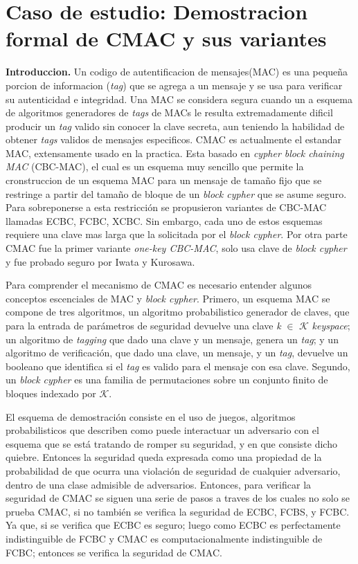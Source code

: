 \documentclass[runningheads]{llncs}
\begin{document}
\section{Caso de estudio: Demostracion formal de CMAC y sus variantes}
\textbf{Introduccion.} Un codigo de autentificacion de mensajes(MAC) es una pequeña porcion de informacion (\textit{tag}) que se agrega a un mensaje y se usa para verificar su autenticidad e integridad. Una MAC se considera segura cuando un a esquema de algoritmos generadores de \textit{tags} de MACs le resulta extremadamente dificil producir un \textit{tag} valido sin conocer la clave secreta, aun teniendo la habilidad de obtener \textit{tags} validos de mensajes especificos. CMAC es actualmente el estandar MAC, extensamente usado en la practica. Esta basado en \textit{cypher block chaining MAC} (CBC-MAC), el cual es un esquema muy sencillo que permite la cronstruccion de un esquema MAC para un mensaje de tamaño fijo que se restringe a partir del tamaño de bloque de un \textit{block cypher} que se asume seguro. Para sobreponerse a esta restricción se propusieron variantes de CBC-MAC llamadas ECBC, FCBC, XCBC. Sin embargo, cada uno de estos esquemas requiere una clave mas larga que la solicitada por el \textit{block cypher}. Por otra parte CMAC fue la primer variante \textit{one-key CBC-MAC}, solo usa clave de \textit{block cypher} y fue probado seguro por Iwata y Kurosawa.

Para comprender el mecanismo de CMAC es necesario entender algunos conceptos escenciales de MAC y \textit{block cypher}. Primero, un esquema MAC se compone de tres algoritmos, un algoritmo probabilistico generador de claves, que para la entrada de parámetros de seguridad devuelve una clave \textit{k} $\in$ $\mathcal{K}$ \textit{keyspace}; un algoritmo de \textit{tagging} que dado una clave y un mensaje, genera un \textit{tag}; y un algoritmo de verificación, que dado una clave, un mensaje, y un \textit{tag}, devuelve un booleano que identifica si el \textit{tag} es valido para el mensaje con esa clave. Segundo, un \textit{block cypher} es una familia de permutaciones sobre un conjunto finito de bloques indexado por $\mathcal{K}$.

El esquema de demostración consiste en el uso de juegos, algoritmos probabilisticos que describen como puede interactuar un adversario con el esquema que se está tratando de romper su seguridad, y en que consiste dicho quiebre. Entonces la seguridad queda expresada como una propiedad de la probabilidad de que ocurra una violación de seguridad de cualquier adversario, dentro de una clase admisible de adversarios. Entonces, para verificar la seguridad de CMAC se siguen una serie de pasos a traves de los cuales no solo se prueba CMAC, si no también se verifica la seguridad de ECBC, FCBS, y FCBC. Ya que, si se verifica que ECBC es seguro; luego como ECBC es perfectamente indistinguible de FCBC y CMAC es computacionalmente indistinguible de FCBC; entonces se verifica la seguridad de CMAC.
\end{document}
